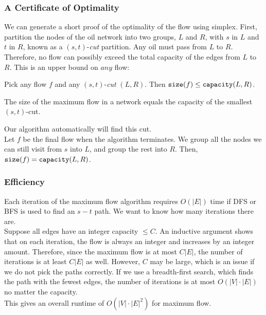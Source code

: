 \subsubsection{A Certificate of Optimality}
We can generate a short proof of the optimality of the flow using simplex.
First, partition the nodes of the oil network into two groups, $L$ and $R$, with $s$ in $L$ and $t$ in $R$, known as a $(s, t)$-\textit{cut} partition.
Any oil must pass from $L$ to $R$.
Therefore, no flow can possibly exceed the total capacity of the edges from $L$ to $R$.
This is an upper bound on $\textit{any}$ flow:
\begin{center}
  Pick any flow $f$ and any $(s, t)$-\textit{cut} $(L, R)$.
  Then $\verb|size|(f) \leq \verb|capacity|(L, R)$.
\end{center}

\begin{theorem}
  The size of the maximum flow in a network equals the capacity of the smallest $(s, t)$-cut.
\end{theorem}
Our algorithm automatically will find this cut.\\
Let $f$ be the final flow when the algorithm terminates.
We group all the nodes we can still visit from $s$ into $L$, and group the rest into $R$.
Then, $\verb|size|(f) = \verb|capacity|(L, R)$.

\subsubsection{Efficiency}
Each iteration of the maximum flow algorithm requires $O(|E|)$ time if DFS or BFS is used to find an $s-t$ path.
We want to know how many iterations there are.\\
Suppose all edges have an integer capacity $\leq C$.
An inductive argument shows that on each iteration, the flow is always an integer and increases by an integer amount.
Therefore, since the maximum flow is at most $C|E|$, the number of iterations is at least $C|E|$ as well.
However, $C$ may be large, which is an issue if we do not pick the paths correctly.
If we use a breadth-first search, which finds the path with the fewest edges, the number of iterations is at most $O(|V| \cdot |E|)$ no matter the capacity.\\
This gives an overall runtime of $O(|V| \cdot |E|^2)$ for maximum flow.

